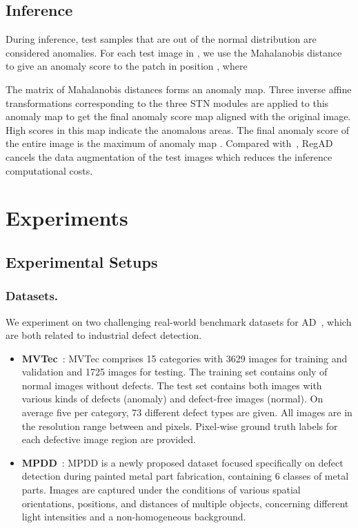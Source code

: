 \documentclass[runningheads]{llncs}
\begin{document}
\subsection{Inference} 
During inference, test samples that are out of the normal distribution are considered anomalies. For each test image in , we use the Mahalanobis distance  to give an anomaly score to the patch in position , where

The matrix of Mahalanobis distances  forms an anomaly map. Three inverse affine transformations corresponding to the three STN modules are applied to this anomaly map to get the final anomaly score map  aligned with the original image. High scores in this map indicate the anomalous areas. The final anomaly score of the entire image is the maximum of anomaly map . Compared with~\cite{TDG,DiffNet}, RegAD cancels the data augmentation of the test images which reduces the inference computational costs.

\section{Experiments}
\subsection{Experimental Setups}
\subsubsection{Datasets.}
We experiment on two challenging real-world benchmark datasets for AD~\cite{bergmann2019mvtec,jezek2021deep}, which are both related to industrial defect detection.
\begin{itemize}
    \item \textbf{MVTec}~\cite{bergmann2019mvtec}: MVTec comprises 15 categories with 3629 images for training and validation and 1725 images for testing. The training set contains only of normal images without defects. The test set contains both images with various kinds of defects (anomaly) and defect-free images (normal). On average five per category, 73 different defect types are given. 
    All images are in the resolution range between  and  pixels. Pixel-wise ground truth labels for each defective image region are provided. 
    \item \textbf{MPDD}~\cite{jezek2021deep}: MPDD is a newly proposed dataset focused specifically on defect detection during painted metal part fabrication, containing 6 classes of metal parts. Images are captured under the conditions of various spatial orientations, positions, and distances of multiple objects, concerning different light intensities and a non-homogeneous background. 
\end{itemize}
\end{document}
